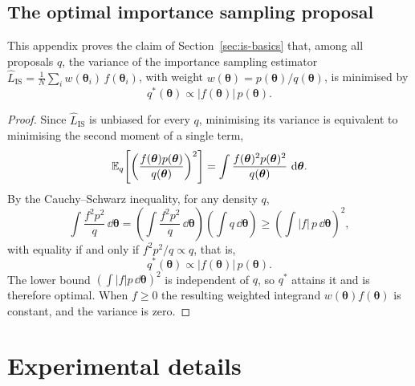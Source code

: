 \section{The optimal importance sampling proposal}
\label{app:is-optimal-proposal}

This appendix proves the claim of Section~\ref{sec:is-basics} that, among
all proposals $q$, the variance of the importance sampling estimator
$\hat{L}_{\mathrm{IS}}
= \frac{1}{N}\sum_{i} w(\bm{\theta}_i)\,f(\bm{\theta}_i)$, with weight
$w(\bm{\theta}) = p(\bm{\theta})/q(\bm{\theta})$, is minimised by
%
\begin{equation}
  q^*(\bm{\theta}) \propto |f(\bm{\theta})|\, p(\bm{\theta}).
  \label{eq:app-is-optimal}
\end{equation}

\begin{proof}
Since $\hat{L}_{\mathrm{IS}}$ is unbiased for every $q$, minimising its
variance is equivalent to minimising the second moment of a single term,
\begin{equation}
  \mathbb{E}_q\!\left[\left(\frac{f(\bm{\theta}) p(\bm{\theta})}{q(\bm{\theta})}\right)^2\right]
  = \int \frac{f(\bm{\theta})^2 p(\bm{\theta})^2}{q(\bm{\theta})}\, \,\mathrm{d}\bm{\theta}.
\end{equation}
By the Cauchy--Schwarz inequality, for any density $q$,
\begin{equation}
  \int \frac{f^2 p^2}{q}\,\dd\bm{\theta}
  = \left(\int \frac{f^2 p^2}{q}\,\dd\bm{\theta}\right)\!\!\left(\int q\,\dd\bm{\theta}\right)
  \geq \left(\int |f|\, p\, \dd\bm{\theta}\right)^2,
\end{equation}
with equality if and only if $f^2 p^2 / q \propto q$, that is,
\begin{equation}
  q^*(\bm{\theta}) \propto |f(\bm{\theta})|\, p(\bm{\theta}).
\end{equation}
The lower bound $\left(\int |f| p\, \dd\bm{\theta}\right)^2$ is independent of $q$,
so $q^*$ attains it and is therefore optimal. When $f \geq 0$ the resulting
weighted integrand $w(\bm{\theta}) f(\bm{\theta})$ is constant, and the variance is zero.
\end{proof}

\chapter{Experimental details}
\label{app:experimental}

